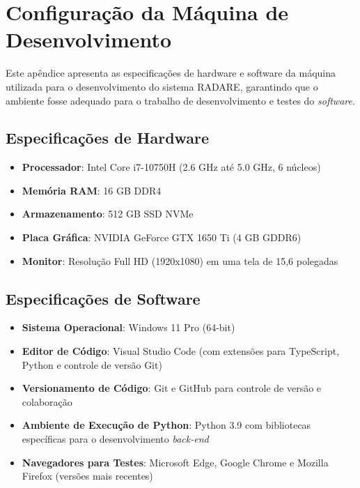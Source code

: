 \chapter{Configuração da Máquina de Desenvolvimento}
\label{Ap:configuracaoMaquina}

Este apêndice apresenta as especificações de hardware e software da máquina utilizada para o desenvolvimento do sistema RADARE, garantindo que o ambiente fosse adequado para o trabalho de desenvolvimento e testes do \textit{software}.

\section{Especificações de Hardware}
\begin{itemize}
    \item \textbf{Processador}: Intel Core i7-10750H (2.6 GHz até 5.0 GHz, 6 núcleos)
    \item \textbf{Memória RAM}: 16 GB DDR4
    \item \textbf{Armazenamento}: 512 GB SSD NVMe
    \item \textbf{Placa Gráfica}: NVIDIA GeForce GTX 1650 Ti (4 GB GDDR6)
    \item \textbf{Monitor}: Resolução Full HD (1920x1080) em uma tela de 15,6 polegadas
\end{itemize}

\section{Especificações de Software}
\begin{itemize}
    \item \textbf{Sistema Operacional}: Windows 11 Pro (64-bit)
    \item \textbf{Editor de Código}: Visual Studio Code (com extensões para TypeScript, Python e controle de versão Git)
    \item \textbf{Versionamento de Código}: Git e GitHub para controle de versão e colaboração
    \item \textbf{Ambiente de Execução de Python}: Python 3.9 com bibliotecas específicas para o desenvolvimento \textit{back-end}
    \item \textbf{Navegadores para Testes}: Microsoft Edge, Google Chrome e Mozilla Firefox (versões mais recentes)
\end{itemize}

